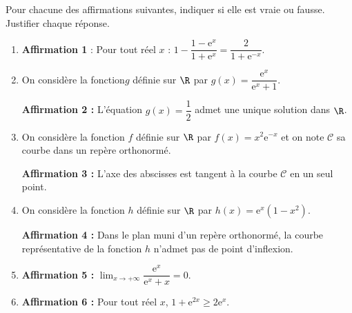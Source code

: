 Pour chacune des affirmations suivantes, indiquer si elle est vraie ou fausse. Justifier chaque réponse.

\medskip

\begin{enumerate}
	\item \textbf{Affirmation 1} : Pour tout réel $x$  : $1 - \dfrac{1 - \text{e}^x}{1 + \text{e}^x} = \dfrac{2}{1 + \text{e}^{-x}}$.
	\item On considère la fonction$g$ définie sur $\R$ par $g(x) = \dfrac{\text{e}^x}{\text{e}^x + 1}$.
	
	\textbf{Affirmation 2 : } L'équation $g(x) = \dfrac12$ admet une unique solution dans $\R$.
	\item On considère la fonction $f$ définie sur $\R$ par $f(x) = x^2\text{e}^{-x}$ et on note 
	$\mathcal{C}$ sa courbe dans un repère orthonormé.
	
	\textbf{Affirmation 3 : } L'axe des abscisses est tangent à la courbe $\mathcal{C}$ en un seul point.
	\item On considère la fonction $h$ définie sur $\R$ par $h(x) = \text{e}^x\left(1 -  x^2\right)$.
	
	\textbf{Affirmation 4 :} Dans le plan muni d'un repère orthonormé, la courbe représentative de la fonction $h$ n'admet pas de point d'inflexion.
	
	\item \textbf{Affirmation 5 :} $\displaystyle\lim_{x \to + \infty} \dfrac{\text{e}^x}{\text{e}^x + x} = 0$.
	
	\item \textbf{Affirmation 6 :} Pour tout réel $x$, $1 + \text{e}^{2x} \geqslant 2\text{e}^x$.
\end{enumerate}